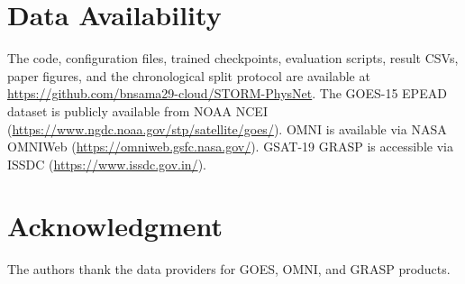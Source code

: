 \documentclass{ieeeaccess}
\begin{document}
\section*{Data Availability}
The code, configuration files, trained checkpoints, evaluation scripts,
result CSVs, paper figures, and the chronological split protocol are
available at
\url{https://github.com/bnsama29-cloud/STORM-PhysNet}.
The GOES-15 EPEAD dataset is publicly available from NOAA NCEI
(\url{https://www.ngdc.noaa.gov/stp/satellite/goes/}).
OMNI is available via NASA OMNIWeb
(\url{https://omniweb.gsfc.nasa.gov/}).
GSAT-19 GRASP is accessible via ISSDC
(\url{https://www.issdc.gov.in/}).
\section*{Acknowledgment}
The authors thank the data providers for GOES, OMNI, and GRASP products.
\end{document}
